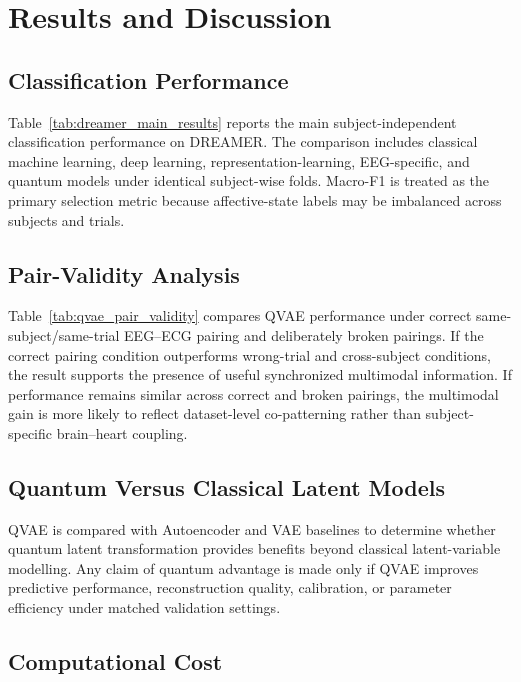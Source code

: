 \section{Results and Discussion}

\subsection{Classification Performance}

Table~\ref{tab:dreamer_main_results} reports the main subject-independent classification performance on DREAMER. The comparison includes classical machine learning, deep learning, representation-learning, EEG-specific, and quantum models under identical subject-wise folds. Macro-F1 is treated as the primary selection metric because affective-state labels may be imbalanced across subjects and trials.


\subsection{Pair-Validity Analysis}

Table~\ref{tab:qvae_pair_validity} compares QVAE performance under correct same-subject/same-trial EEG--ECG pairing and deliberately broken pairings. If the correct pairing condition outperforms wrong-trial and cross-subject conditions, the result supports the presence of useful synchronized multimodal information. If performance remains similar across correct and broken pairings, the multimodal gain is more likely to reflect dataset-level co-patterning rather than subject-specific brain--heart coupling.

\subsection{Quantum Versus Classical Latent Models}

QVAE is compared with Autoencoder and VAE baselines to determine whether quantum latent transformation provides benefits beyond classical latent-variable modelling. Any claim of quantum advantage is made only if QVAE improves predictive performance, reconstruction quality, calibration, or parameter efficiency under matched validation settings.

\subsection{Computational Cost}

